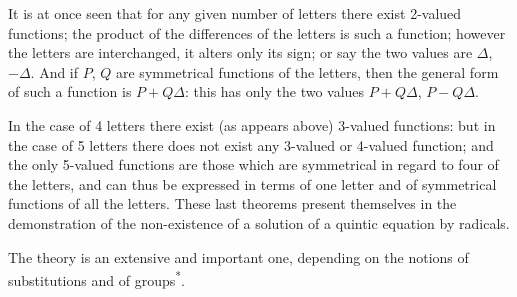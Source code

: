 \documentclass[11pt,a4paper]{book}
\begin{document}
It is at once seen that for any given number of letters there exist 2-valued functions; the product of the differences of the letters is such a function; however the letters are interchanged, it alters only its sign; or say the two values are $\Delta$, $-\Delta$. And if $P$, $Q$ are symmetrical functions of the letters, then the general form of such a function is $P + Q\Delta$: this has only the two values $P + Q\Delta$, $P - Q\Delta$.

In the case of 4 letters there exist (as appears above) 3-valued functions: but in the case of 5 letters there does not exist any 3-valued or 4-valued function; and the only 5-valued functions are those which are symmetrical in regard to four of the letters, and can thus be expressed in terms of one letter and of symmetrical functions of all the letters. These last theorems present themselves in the demonstration of the non-existence of a solution of a quintic equation by radicals.

The theory is an extensive and important one, depending on the notions of substitutions and of groups\textsuperscript{*}.
\end{document}
